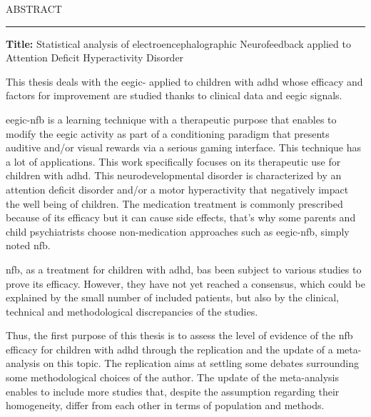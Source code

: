 

\begin{center}
\MakeUppercase{\LARGE{A}\Large{bstract}} \\
\vspace{0mm}
\noindent\rule{16cm}{0.4pt}
\end{center}

\textbf{Title:} Statistical analysis of electroencephalographic Neurofeedback applied to Attention Deficit Hyperactivity Disorder

This thesis deals with the \gls{eegic}- applied to children with \gls{adhd} whose efficacy and factors for 
improvement are studied thanks to clinical data and \gls{eegic} signals.

\gls{eegic}-\gls{nfb} is a learning technique with a therapeutic purpose that enables to modify the \gls{eegic} activity 
as part of a conditioning paradigm that presents auditive and/or visual rewards via a serious gaming interface.
This technique has a lot of applications. This work specifically focuses on its therapeutic use for children with \gls{adhd}.
This neurodevelopmental disorder is characterized by an attention deficit disorder and/or a motor hyperactivity that
negatively impact the well being of children. The medication treatment is commonly prescribed because of its efficacy but
it can cause side effects, that's why some parents and child psychiatrists choose non-medication approaches such as \gls{eegic}-\gls{nfb}, simply noted 
\gls{nfb}. 

\gls{nfb}, as a treatment for children with \gls{adhd}, bas been subject to various studies to prove its efficacy. 
However, they have not yet reached a consensus, which could be explained by the small number of included patients, but also by
the clinical, technical and methodological discrepancies of the studies.  

Thus, the first purpose of this thesis is to assess the level of evidence of the \gls{nfb} efficacy for children with \gls{adhd}
through the replication and the update of a meta-analysis on this topic. 
The replication aims at settling some debates surrounding some methodological choices of the author. 
The update of the meta-analysis enables to include more studies that, despite the assumption regarding their homogeneity, 
differ from each other in terms of population and methods.

